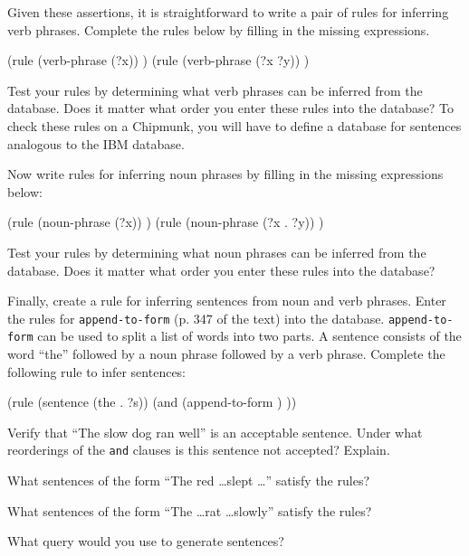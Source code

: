 \exercise Given these assertions, it is straightforward to write a pair
of rules for inferring verb phrases.  Complete the rules below by 
filling in the missing expressions.

\beginlisp
(rule (verb-phrase (?x))
  )
\null
(rule (verb-phrase (?x ?y))
  )
\endlisp

Test your rules by determining what verb phrases can be inferred from
the database.  Does it matter what order you enter these rules into
the database?  To check these rules on a Chipmunk, you will have to
define a database for sentences analogous to the IBM database.

\exercise Now write rules for inferring noun phrases by filling in the
missing expressions below:

\beginlisp
(rule (noun-phrase (?x))
  )
\null
(rule (noun-phrase (?x . ?y))
  )
\endlisp

Test your rules by determining what noun phrases can be inferred from the database.
Does it matter what order you enter these rules into the database?

\exercise Finally, create a rule for inferring sentences from noun and verb phrases.
Enter the rules for {\tt append-to-form} (p. 347 of the text) into the database.
{\tt append-to-form} can be used to split a list of words into two parts.  A sentence
consists of the word ``the'' followed by a noun phrase followed by a verb phrase.
Complete the following rule to infer sentences:

\beginlisp
(rule (sentence (the . ?s))
  (and (append-to-form )
        ))
       
\endlisp

Verify that ``The slow dog ran well'' is an acceptable sentence.  Under what reorderings
of the {\tt and} clauses is this sentence not accepted?  Explain.

\exercise What sentences of the form ``The red \ldots slept \ldots'' satisfy 
the rules?

\exercise What sentences of the form ``The \ldots rat \ldots slowly'' satisfy
the rules?

\exercise What query would you use to generate sentences?


